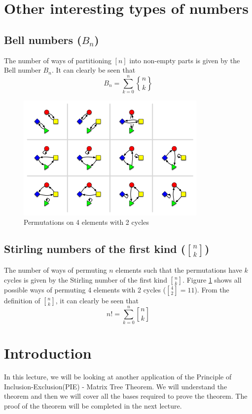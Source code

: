 \section{Other interesting types of numbers}
\subsection{Bell numbers ($B_n$) }
    The number of ways of partitioning $[n]$ into non-empty parts is given by the Bell number $B_n$. It can clearly be seen that 
    $$B_n = \sum_{k=0}^{n} {n \brace k}$$
    \begin{figure}[h]
        \centering
         \includegraphics[scale = 0.7]{images/Stirling1.png}
        \caption{Permutations on 4 elements with 2 cycles }
        \label{Fig:StirlingI}
    \end{figure}
\subsection{Stirling numbers of the first kind (${n \brack k}$)} The number of ways of permuting $n$ elements such that the permutations have $k$ cycles is given by the Stirling number of the first kind ${n \brack k}$. Figure \ref{Fig:StirlingI} shows all possible ways of permuting 4 elements with 2 cycles (${4 \brack 2} = 11$). From the definition of ${n \brack k}$, it can clearly be seen that $$n! = \sum_{k=0}^{n} {n \brack k}$$


\section{Introduction}
In this lecture, we will be looking at another application of the Principle of Inclusion-Exclusion(PIE) - Matrix Tree Theorem. We will understand the theorem and then we will cover all the bases required to prove the theorem. The proof of the theorem will be completed in the next lecture.


